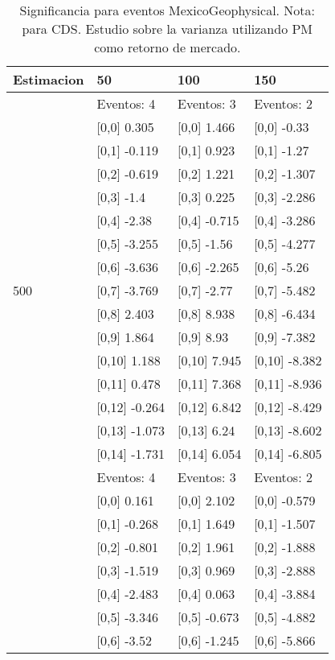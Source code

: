 \begin{table}

\caption{Significancia para eventos MexicoGeophysical. Nota: para CDS. Estudio sobre la varianza utilizando PM como retorno de mercado.}
\centering
\begin{tabular}[t]{llll}
\toprule
Estimacion & 50 & 100 & 150\\
\midrule
 & Eventos:  4 & Eventos:  3 & Eventos:  2\\
 & {}[0,0] 0.305 & {}[0,0] 1.466 & {}[0,0] -0.33\\
 & {}[0,1] -0.119 & {}[0,1] 0.923 & {}[0,1] -1.27\\
 & {}[0,2] -0.619 & {}[0,2] 1.221 & {}[0,2] -1.307\\
 & {}[0,3] -1.4 & {}[0,3] 0.225 & {}[0,3] -2.286\\
\addlinespace
 & {}[0,4] -2.38 & {}[0,4] -0.715 & {}[0,4] -3.286\\
 & {}[0,5] -3.255 & {}[0,5] -1.56 & {}[0,5] -4.277\\
 & {}[0,6] -3.636 & {}[0,6] -2.265 & {}[0,6] -5.26\\
500 & {}[0,7] -3.769 & {}[0,7] -2.77 & {}[0,7] -5.482\\
 & {}[0,8] 2.403 & {}[0,8] 8.938 & {}[0,8] -6.434\\
\addlinespace
 & {}[0,9] 1.864 & {}[0,9] 8.93 & {}[0,9] -7.382\\
 & {}[0,10] 1.188 & {}[0,10] 7.945 & {}[0,10] -8.382\\
 & {}[0,11] 0.478 & {}[0,11] 7.368 & {}[0,11] -8.936\\
 & {}[0,12] -0.264 & {}[0,12] 6.842 & {}[0,12] -8.429\\
 & {}[0,13] -1.073 & {}[0,13] 6.24 & {}[0,13] -8.602\\
\addlinespace
 & {}[0,14] -1.731 & {}[0,14] 6.054 & {}[0,14] -6.805\\
 & Eventos:  4 & Eventos:  3 & Eventos:  2\\
 & {}[0,0] 0.161 & {}[0,0] 2.102 & {}[0,0] -0.579\\
 & {}[0,1] -0.268 & {}[0,1] 1.649 & {}[0,1] -1.507\\
 & {}[0,2] -0.801 & {}[0,2] 1.961 & {}[0,2] -1.888\\
\addlinespace
 & {}[0,3] -1.519 & {}[0,3] 0.969 & {}[0,3] -2.888\\
 & {}[0,4] -2.483 & {}[0,4] 0.063 & {}[0,4] -3.884\\
 & {}[0,5] -3.346 & {}[0,5] -0.673 & {}[0,5] -4.882\\
 & {}[0,6] -3.52 & {}[0,6] -1.245 & {}[0,6] -5.866\\

\end{tabular}
\end{table}
